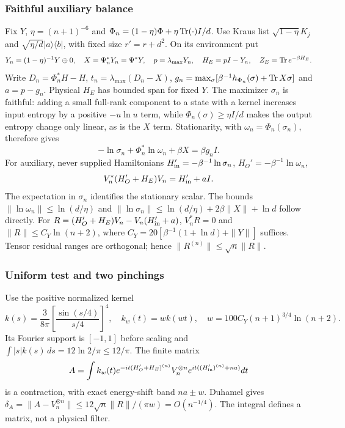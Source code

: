 \subsubsection{Faithful auxiliary balance}
Fix $Y$, $\eta=(n+1)^{-6}$ and
$\Phi_n=(1-\eta)\Phi+\eta\operatorname{Tr}(\cdot)I/d$. Use Kraus list
$\sqrt{1-\eta}K_j$ and $\sqrt{\eta/d}|a\rangle\langle b|$, with fixed
size $r'=r+d^2$. On its environment put
\[
 Y_n=(1-\eta)^{-1}Y\oplus0,\quad X=\Psi_n^*Y_n=\Psi^*Y,\quad
 p=\lambda_{\max}Y_n,\quad H_E=pI-Y_n,\quad Z_E=\operatorname{Tr} e^{-\beta H_E}.
\]
Write $D_n=\Phi_n^*H-H$, $t_n=\lambda_{\max}(D_n-X)$,
$g_n=\max_\sigma[\beta^{-1}h_{\Phi_n}(\sigma)+\operatorname{Tr} X\sigma]$ and
$a=p-g_n$. Physical $H_E$ has bounded span for fixed $Y$.
The maximizer $\sigma_n$ is faithful: adding a small full-rank
component to a state with a kernel increases input entropy by a
positive $-u\ln u$ term, while $\Phi_n(\sigma)\ge\eta I/d$ makes the
output entropy change only linear, as is the $X$ term. Stationarity,
with $\omega_n=\Phi_n(\sigma_n)$, therefore gives
\[
 -\ln\sigma_n+\Phi_n^*\ln\omega_n+\beta X=\beta g_n I.
\]
For auxiliary, never supplied Hamiltonians
$H_{\rm in}'=-\beta^{-1}\ln\sigma_n$, $H_O'=-\beta^{-1}\ln\omega_n$,
\begin{equation}\label{kt:bp-auxbalance}
 V_n^*(H_O'+H_E)V_n=H_{\rm in}'+aI.
\end{equation}
The expectation in $\sigma_n$ identifies the stationary scalar.
The bounds $\|\ln\omega_n\|\le\ln(d/\eta)$ and
$\|\ln\sigma_n\|\le\ln(d/\eta)+2\beta\|X\|+\ln d$ follow directly.
For $R=(H_O'+H_E)V_n-V_n(H_{\rm in}'+a)$, $V_n^*R=0$ and
$\|R\|\le C_Y\ln(n+2)$, where
$C_Y=20[\beta^{-1}(1+\ln d)+\|Y\|]$ suffices.
Tensor residual ranges are orthogonal; hence
$\|R^{(n)}\|\le\sqrt n\|R\|$.

\subsubsection{Uniform test and two pinchings}
Use the positive normalized kernel
\[
 k(s)=\frac3{8\pi}\left[\frac{\sin(s/4)}{s/4}\right]^4,\quad
 k_w(t)=wk(wt),\quad w=100C_Y(n+1)^{3/4}\ln(n+2).
\]
Its Fourier support is $[-1,1]$ before scaling and
$\int |s|k(s)\,ds=12\ln2/\pi\le12/\pi$. The finite matrix
\[
 A=\int k_w(t)e^{-it(H_O'+H_E)^{(n)}}V_n^{\otimes n}
                  e^{it((H_{\rm in}')^{(n)}+na)}dt
\]
is a contraction, with exact energy-shift band $na\pm w$.
Duhamel gives
$\delta_A=\|A-V_n^{\otimes n}\|\le12\sqrt n\|R\|/(\pi w)=O(n^{-1/4})$.
The integral defines a matrix, not a physical filter.

